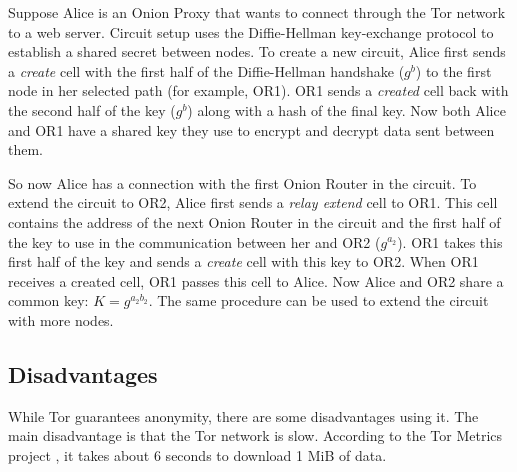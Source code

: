 \documentclass{article}
\begin{document}
		
		
		Suppose Alice is an Onion Proxy that wants to connect through the Tor network to a web server. Circuit setup uses the Diffie-Hellman key-exchange protocol \cite{diffiehellman} to establish a shared secret between nodes. To create a new circuit, Alice first sends a \emph{create} cell with the first half of the Diffie-Hellman handshake ($ g^b $) to the first node in her selected path (for example, OR1). OR1 sends a \emph{created} cell back with the second half of the key ($ g^b $) along with a hash of the final key. Now both Alice and OR1 have a shared key they use to encrypt and decrypt data sent between them.
		
		So now Alice has a connection with the first Onion Router in the circuit. To extend the circuit to OR2, Alice first sends a \emph{relay extend} cell to OR1. This cell contains the address of the next Onion Router in the circuit and the first half of the key to use in the communication between her and OR2 ($ g^{a_2} $). OR1 takes this first half of the key and sends a \emph{create} cell with this key to OR2. When OR1 receives a created cell, OR1 passes this cell to Alice. Now Alice and OR2 share a common key: $ K = g^{a_2b_2} $. The same procedure can be used to extend the circuit with more nodes.
			
	\subsection{Disadvantages}
		\label{ss:tor_disadvantages}

		While Tor guarantees anonymity, there are some disadvantages using it. The main disadvantage is that the Tor network is slow. According to the Tor Metrics project \cite{tormetricsprojectwebsite}, it takes about 6 seconds to download 1 MiB of data.
		
\end{document}
